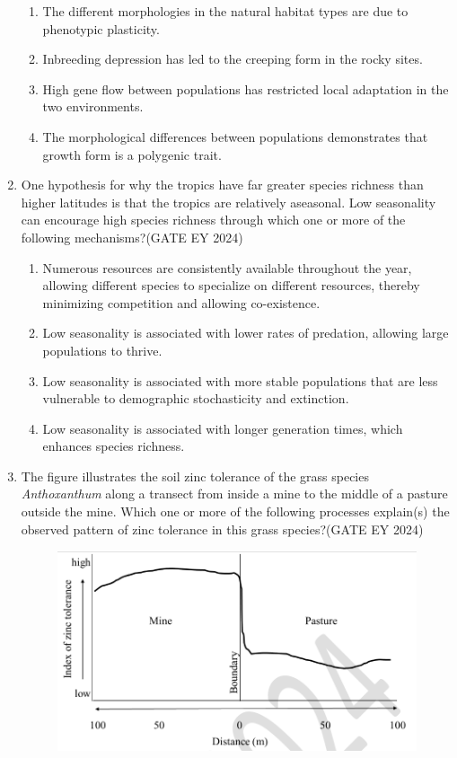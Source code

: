 \begin{enumerate}
\begin{enumerate}
        \item The different morphologies in the natural habitat types are due to phenotypic plasticity.
        \item Inbreeding depression has led to the creeping form in the rocky sites.
        \item High gene flow between populations has restricted local adaptation in the two environments.
        \item The morphological differences between populations demonstrates that growth form is a polygenic trait.
    \end{enumerate}
\item One hypothesis for why the tropics have far greater species richness than higher latitudes is that the tropics are relatively aseasonal. Low seasonality can encourage high species richness through which one or more of the following mechanisms?\hfill{(GATE EY 2024)}
    \begin{enumerate}
        \item Numerous resources are consistently available throughout the year, allowing different species to specialize on different resources, thereby minimizing competition and allowing co-existence.
        \item Low seasonality is associated with lower rates of predation, allowing large populations to thrive.
        \item Low seasonality is associated with more stable populations that are less vulnerable to demographic stochasticity and extinction.
        \item Low seasonality is associated with longer generation times, which enhances species richness.
    \end{enumerate}
\item The figure illustrates the soil zinc tolerance of the grass species \textit{Anthoxanthum} along a transect from inside a mine to the middle of a pasture outside the mine. Which one or more of the following processes explain(s) the observed pattern of zinc tolerance in this grass species?\hfill{(GATE EY 2024)}
\begin{figure}[!ht]
    \centering
    \includegraphics[width=0.8\columnwidth]{figs/Q-62.png}

\end{figure}
\end{enumerate}
